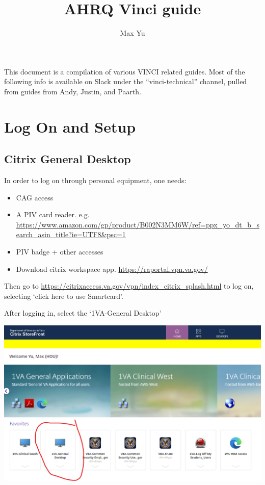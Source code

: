 \documentclass[12pt]{article}
\theoremstyle{definition}
\begin{document}
 
\title{AHRQ Vinci guide}
\author{Max Yu}
\date{}
\maketitle

This document is a compilation of various VINCI related guides. Most of the following info is available on Slack under the ``vinci-technical'' channel, pulled from guides from Andy, Justin, and Paarth. 

\tableofcontents




\section{Log On and Setup}
\subsection{Citrix General Desktop}
In order to log on through personal equipment, one needs:
\begin{itemize}
    \item CAG access
    \item A PIV card reader. e.g. \url{https://www.amazon.com/gp/product/B002N3MM6W/ref=ppx_yo_dt_b_search_asin_title?ie=UTF8&psc=1}
    \item PIV badge + other accesses
    \item Download citrix workspace app. \url{https://raportal.vpn.va.gov/}
\end{itemize} 

Then go to \url{https://citrixaccess.va.gov/vpn/index_citrix_splash.html} to log on, selecting `click here to use Smartcard'.

After logging in, select the `1VA-General Desktop' 

\includegraphics[width=\linewidth]{screenshots/citrix-logon-general-desktop.png}
\end{document}
